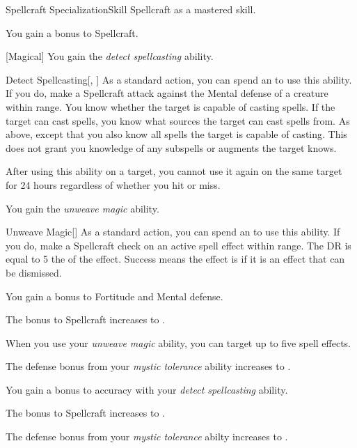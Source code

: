     \begin{feat}{Spellcraft Specialization}{Skill}
        \featpre Spellcraft as a mastered skill.

         You gain a  bonus to Spellcraft.

        [Magical] You gain the \textit{detect spellcasting} ability.
        \begin{ability}{Detect Spellcasting}[, ]
            As a standard action, you can spend an  to use this ability.
            If you do, make a Spellcraft attack against the Mental defense of a creature within \rngmed range.
            \hit You know whether the target is capable of casting spells.
            If the target can cast spells, you know what sources the target can cast spells from.
            \crit As above, except that you also know all spells the target is capable of casting.
            This does not grant you knowledge of any subspells or augments the target knows.

            After using this ability on a target, you cannot use it again on the same target for 24 hours regardless of whether you hit or miss.
        \end{ability}

         You gain the \textit{unweave magic} ability.
        \begin{ability}{Unweave Magic}[]
            As a standard action, you can spend an  to use this ability.
            If you do, make a Spellcraft check on an active spell effect within \rngmed range.
            The DR is equal to 5 \add the  of the effect.
            Success means the effect is  if it is an effect that can be dismissed.
        \end{ability}

         You gain a  bonus to Fortitude and Mental defense.

         The bonus to Spellcraft increases to .

         When you use your \textit{unweave magic} ability, you can target up to five spell effects.

         The defense bonus from your \textit{mystic tolerance} ability increases to .

         You gain a  bonus to accuracy with your \textit{detect spellcasting} ability.

         The bonus to Spellcraft increases to .

         The defense bonus from your \textit{mystic tolerance} abilty increases to .
    \end{feat}

